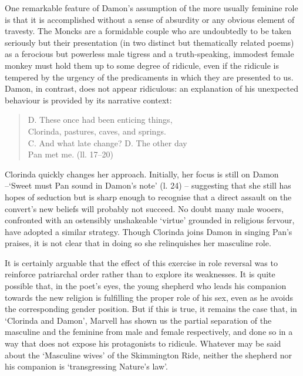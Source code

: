 ﻿\documentclass[12pt]{article}
\begin{document}
One
remarkable feature of Damon’s assumption of the more usually feminine role is
that it is accomplished without a sense of absurdity or any obvious element of
travesty. The Moncks are a formidable couple who are undoubtedly to be taken
seriously but their presentation (in two distinct but thematically related
poems) as a ferocious but powerless male tigress and a truth-speaking, immodest
female monkey must hold them up to some degree of ridicule, even if the
ridicule is tempered by the urgency of the predicaments in which they are
presented to us. Damon, in contrast, does not appear ridiculous: an explanation
of his unexpected behaviour is provided by its narrative context:

\begin{verse}
D. These once had been enticing things,\\
Clorinda, pastures, caves, and springs.\\
C. And what late change? D. The other day\\
Pan met me. (ll. 17–20)
\end{verse}
Clorinda quickly changes her approach. Initially, her focus is still on Damon –‘Sweet
must Pan sound in Damon’s note’ (l. 24) – suggesting that she still has hopes
of seduction but is sharp enough to recognise that a direct assault on the
convert’s new beliefs will probably not succeed. No doubt many male wooers,
confronted with an ostensibly unshakeable ‘virtue’ grounded in religious
fervour, have adopted a similar strategy. Though Clorinda joins Damon in
singing Pan’s praises, it is not clear that in doing so she relinquishes her
masculine role.

It
is certainly arguable that the effect of this exercise in role reversal was to
reinforce patriarchal order rather than to explore its weaknesses. It is quite
possible that, in the poet’s eyes, the young shepherd who leads his companion
towards the new religion is fulfilling the proper role of his sex, even as he
avoids the corresponding gender position. But if this is true, it remains the
case that, in ‘Clorinda and Damon’, Marvell has shown us the partial separation
of the masculine and the feminine from male and female respectively, and done
so in a way that does not expose his protagonists to ridicule. Whatever may be
said about the ‘Masculine wives’ of the Skimmington Ride, neither the shepherd
nor his companion is ‘transgressing Nature’s law’.
\end{document}

